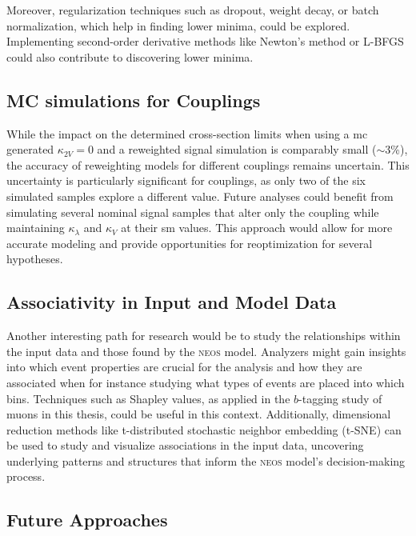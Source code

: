 Moreover, regularization techniques such as dropout, weight decay, or batch normalization, which help in finding lower minima, could be explored. Implementing second-order derivative methods like Newton's method or L-BFGS could also contribute to discovering lower minima.



\subsection{MC simulations for \ktwov Couplings}
While the impact on the determined cross-section limits when using a \ac{mc} generated $\kappa_{2V} = 0$ and a reweighted signal simulation is comparably small ($\sim$3\%), the accuracy of reweighting models for different \ktwov couplings remains uncertain. This uncertainty is particularly significant for \ktwov couplings, as only two of the six simulated samples explore a different \ktwov value. Future analyses could benefit from simulating several nominal signal samples that alter only the \ktwov coupling while maintaining $\kappa_\lambda$ and $\kappa_V$ at their \ac{sm} values. This approach would allow for more accurate modeling and provide opportunities for reoptimization for several \ktwov hypotheses.


\subsection{Associativity in Input and Model Data}
Another interesting path for research would be to study the relationships within the input data and those found by the \textsc{neos} model. Analyzers might gain insights into which event properties are crucial for the analysis and how they are associated when for instance studying what types of events are placed into which bins. Techniques such as Shapley values, as applied in the $b$-tagging study of muons in this thesis, could be useful in this context. Additionally, dimensional reduction methods like t-distributed stochastic neighbor embedding (t-SNE) can be used to study and visualize associations in the input data, uncovering underlying patterns and structures that inform the \textsc{neos} model's decision-making process.

\subsection{Future Approaches}


